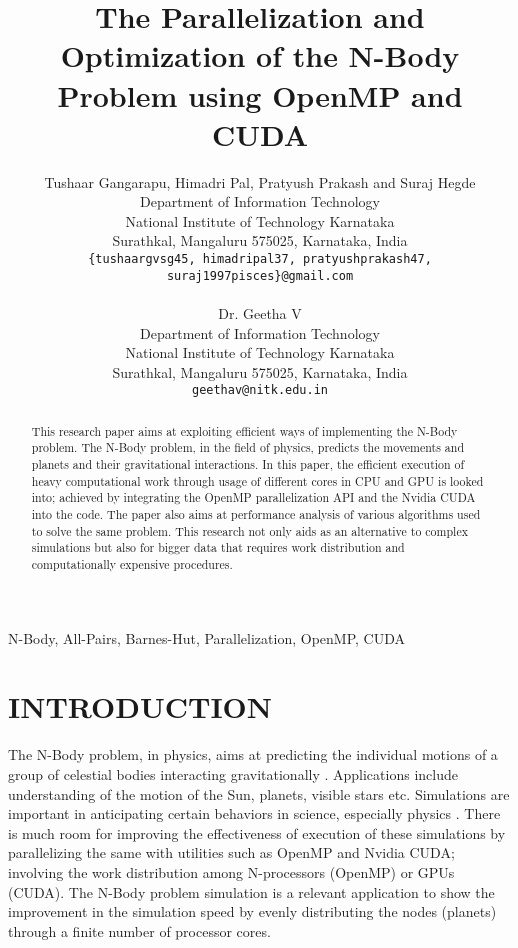 \documentclass[letterpaper, 10 pt, conference]{ieeeconf}
\title{\LARGE \bf
The Parallelization and Optimization of the N-Body Problem using OpenMP and CUDA
}
\author{Tushaar Gangarapu, Himadri Pal, Pratyush Prakash and Suraj Hegde%
\\ Department of Information Technology \\
National Institute of Technology Karnataka \\
Surathkal, Mangaluru 575025, Karnataka, India \\
{\tt\small\{tushaargvsg45, himadripal37, pratyushprakash47, suraj1997pisces\}@gmail.com} \\ \\
Dr. Geetha V%
\\ Department of Information Technology \\
National Institute of Technology Karnataka \\
Surathkal, Mangaluru 575025, Karnataka, India \\
{\tt\small geethav@nitk.edu.in}
}
\begin{document}
\maketitle
\thispagestyle{plain}
\pagestyle{plain}



\begin{abstract}

This research paper aims at exploiting efficient ways of implementing the N-Body problem. The N-Body problem, in the field of physics, predicts the movements and planets and their gravitational interactions. In this paper, the efficient execution of heavy computational work through usage of different cores in CPU and GPU is looked into; achieved by integrating the OpenMP parallelization API and the Nvidia CUDA into the code. The paper also aims at performance analysis of various algorithms used to solve the same problem. This research not only aids as an alternative to complex simulations but also for bigger data that requires work distribution and computationally expensive procedures.\\

\end{abstract}

\begin{keywords}

N-Body, All-Pairs, Barnes-Hut, Parallelization, OpenMP, CUDA

\end{keywords}

\section{INTRODUCTION}

The N-Body problem, in physics, aims at predicting the individual motions of a group of celestial bodies interacting gravitationally \cite{c1}.  Applications include understanding of the motion of the Sun, planets, visible stars etc. Simulations are important in anticipating certain behaviors in science, especially physics \cite{c2}. There is much room for improving the effectiveness of execution of these simulations by parallelizing the same with utilities such as OpenMP and Nvidia CUDA; involving the work distribution among N-processors (OpenMP) or GPUs (CUDA). The N-Body problem simulation is a relevant application to show the improvement in the simulation speed by evenly distributing the nodes (planets) through a finite number of processor cores.\par
\end{document}

